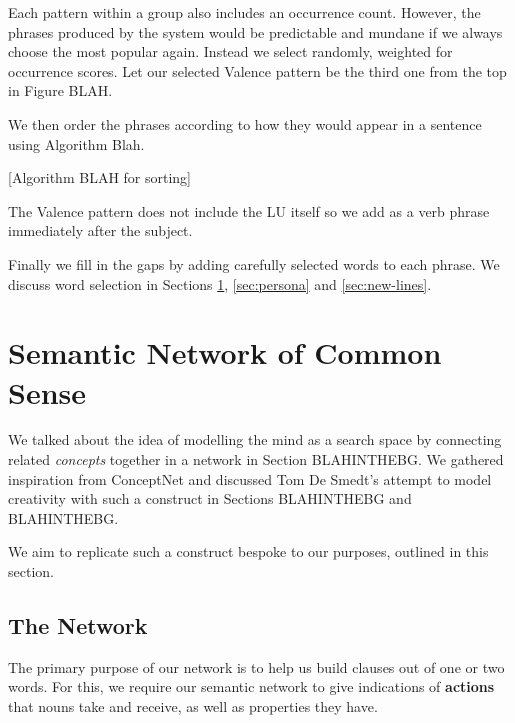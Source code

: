 Each pattern within a group also includes an occurrence count. However, the phrases produced by the system would be predictable and mundane if we always choose the most popular again. Instead we select randomly, weighted for occurrence scores. Let our selected Valence pattern be the third one from the top in Figure BLAH.

We then order the phrases according to how they would appear in a sentence using Algorithm Blah.

[Algorithm BLAH for sorting]

The Valence pattern does not include the LU itself so we add as a verb phrase immediately after the subject.

Finally we fill in the gaps by adding carefully selected words to each phrase. We discuss word selection in Sections \ref{sec:common-sense}, \ref{sec:persona} and \ref{sec:new-lines}.




\section{Semantic Network of Common Sense}
\label{sec:common-sense}
We talked about the idea of modelling the mind as a search space by connecting related \textit{concepts} together in a network in Section BLAHINTHEBG. We gathered inspiration from ConceptNet and discussed Tom De Smedt's attempt to model creativity with such a construct in Sections BLAHINTHEBG and BLAHINTHEBG.

We aim to replicate such a construct bespoke to our purposes, outlined in this section.

\subsection{The Network}
The primary purpose of our network is to help us build clauses out of one or two words. For this, we require our semantic network to give indications of \textbf{actions} that nouns take and receive, as well as properties they have.

